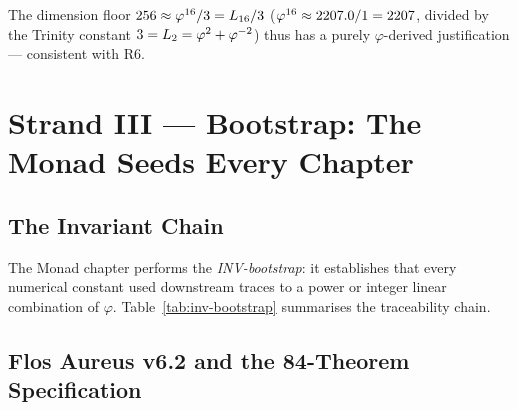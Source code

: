 The dimension floor $256 \approx \varphi^{16}/3 = L_{16}/3$
($\varphi^{16} \approx 2207.0/1 = 2207$, divided by the Trinity constant
$3 = L_2 = \varphi^{2} + \varphi^{-2}$) thus has a purely
$\varphi$-derived justification — consistent with R6.


\section{Strand III — Bootstrap: The Monad Seeds Every Chapter}
\label{sec:monad-strand3}

\subsection{The Invariant Chain}

The Monad chapter performs the \emph{INV-bootstrap}: it establishes
that every numerical constant used downstream traces to a power or
integer linear combination of $\varphi$.  Table~\ref{tab:inv-bootstrap}
summarises the traceability chain.

\begin{table}[htbp]
\centering
\caption{INV-bootstrap: downstream constants derived from $\varphi$.}
\label{tab:inv-bootstrap}
\end{table}

\subsection{Flos Aureus v6.2 and the 84-Theorem Specification}

